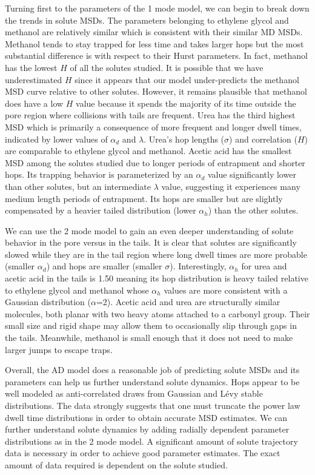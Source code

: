 \documentclass{article}
\begin{document}
  Turning first to the parameters of the 1 mode model, we can begin to break down the
  trends in solute MSDs. The parameters belonging to ethylene glycol and methanol are
  relatively similar which is consistent with their similar MD MSDs. Methanol 
  tends to stay trapped for less time and takes larger hops but the most substantial
  difference is with respect to their Hurst parameters. In fact, methanol has the lowest
  $H$ of all the solutes studied. It is possible that we have underestimated $H$ since 
  it appears that our model under-predicts the methanol MSD curve relative
  to other solutes. However, it remains plausible that methanol does have a low $H$ 
  value because it spends the majority of its time outside the pore region where collisions
  with tails are frequent. Urea has the third highest MSD which is primarily a consequence of
  more frequent and longer dwell times, indicated by lower values of $\alpha_d$ and 
  $\lambda$. Urea's hop lengths ($\sigma$) and correlation ($H$) are comparable to ethylene
  glycol and methanol. Acetic acid has the smallest MSD among the solutes studied due 
  to longer periods of entrapment and shorter hops. Its trapping behavior is parameterized
  by an $\alpha_d$ value significantly lower than other solutes, but an intermediate 
  $\lambda$ value, suggesting it experiences many medium length periods of entrapment. 
  Its hops are smaller but are slightly compensated by a heavier tailed distribution 
  (lower $\alpha_h$) than the other solutes. 
  
  We can use the 2 mode model to gain an even deeper understanding of solute behavior
  in the pore versus in the tails. It is clear that solutes are significantly slowed 
  while they are in the tail region where long dwell times are more probable
  (smaller $\alpha_d$) and hops are smaller (smaller $\sigma$). Interestingly, 
  $\alpha_h$ for urea and acetic acid in the tails is 1.50 meaning its hop distribution
  is heavy tailed relative to ethylene glycol and methanol whose $\alpha_h$ values are
  more consistent with a Gaussian distribution ($\alpha$=2). Acetic acid and urea are
  structurally similar molecules, both planar with two heavy atoms attached to a 
  carbonyl group. Their small size and rigid shape may allow them to occasionally slip
  through gaps in the tails. Meanwhile, methanol is small enough that it does not need
  to make larger jumps to escape traps. 
  
  Overall, the AD model does a reasonable job of predicting solute MSDs and its 
  parameters can help us further understand solute dynamics. Hops appear to be well
  modeled as anti-correlated draws from Gaussian and L\'evy stable distributions. 
  The data strongly suggests that one must truncate the power law dwell time 
  distributions in order to obtain accurate MSD estimates. We can further understand
  solute dynamics by adding radially dependent parameter distributions as in the 
  2 mode model. A significant amount of solute trajectory data is necessary 
  in order to achieve good parameter estimates. The exact amount of data required 
  is dependent on the solute studied. 
  
\end{document}
